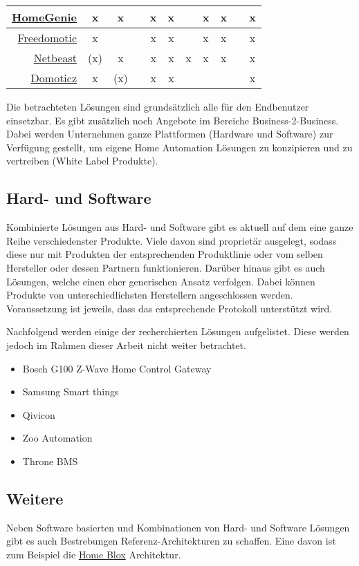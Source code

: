 \begin{table}[H]
\begin{tabular}{r | c  | c | c | c | c | c | c | c | c | c}
\midrule 
\hyperlink{http://www.homegenie.it/}{HomeGenie}
	& x
	& x
	& 
	& x
	& x
	& 
	& x
	& x
	& 
	& x\\
	
\midrule
\hyperlink{http://www.freedomotic.com/}{Freedomotic}
	& x
	& 
	& 
	& x\footnotemark[1]
	& x
	& 
	& x
	& x
	& 
	& x\\
	
\midrule
\hyperlink{https://netbeast.co/}{Netbeast}
	& (x)
	& x
	& 
	& x
	& x
	& x
	& x
	& x
	& 
	& x\\
	
\midrule
\hyperlink{http://www.domoticz.com/}{Domoticz}
	& x
	& (x)
	& 
	& x
	& x
	& 
	& \footnotemark[2]
	& \footnotemark[2]
	& 
	& x\\
\bottomrule
\end{tabular}
\end{table}


Die betrachteten Lösungen sind grundsätzlich alle für den Endbenutzer einsetzbar. Es gibt zusätzlich noch Angebote im Bereiche Business-2-Business. Dabei werden Unternehmen ganze Plattformen (Hardware und Software) zur Verfügung gestellt, um eigene Home Automation Lösungen zu konzipieren und zu vertreiben (White Label Produkte).

\subsection{Hard- und Software}
Kombinierte Lösungen aus Hard- und Software gibt es aktuell auf dem eine ganze Reihe verschiedenster Produkte. Viele davon sind proprietär ausgelegt, sodass diese nur mit Produkten der entsprechenden Produktlinie oder vom selben Hersteller oder dessen Partnern funktionieren. Darüber hinaus gibt es auch Lösungen, welche einen eher generischen Ansatz verfolgen. Dabei können Produkte von unterschiedlichsten Herstellern angeschlossen werden. Voraussetzung ist jeweils, dass das entsprechende Protokoll unterstützt wird.

Nachfolgend werden einige der recherchierten Lösungen aufgelistet. Diese werden jedoch im Rahmen dieser Arbeit nicht weiter betrachtet.

\begin{itemize}
\item Bosch G100 Z-Wave Home Control Gateway
\item Samsung Smart things
\item Qivicon
\item Zoo Automation
\item Throne BMS
\end{itemize}

\subsection{Weitere}
Neben Software basierten und Kombinationen von Hard- und Software Lösungen gibt es auch Bestrebungen Referenz-Architekturen zu schaffen. Eine davon ist zum Beispiel die  \hyperlink{http://www.ubicomp.org/ubicomp2013/adjunct/adjunct/p801.pdf}{Home Blox} Architektur.


